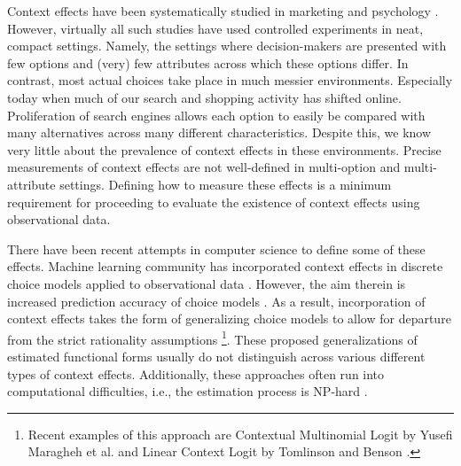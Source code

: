 \documentclass[a4paper,12pt]{article}
\newcommand{\citeyearonly}[1]{\citeyearpar{#1}}
\begin{document}
Context effects have been systematically studied in marketing and psychology \citep{kivetz04, roodrkerkEtAl11, frederickEtAl14, dotsonEtAl18}. However, virtually all such studies have used controlled experiments in neat, compact settings. Namely, the settings where decision-makers are presented with few options and (very) few attributes across which these options differ. In contrast, most actual choices take place in much messier environments. Especially today when much of our search and shopping activity has shifted online. Proliferation of search engines allows each option to easily be compared with many alternatives across many different characteristics. Despite this, we know very little about the prevalence of context effects in these environments. Precise measurements of context effects are not well-defined in multi-option and multi-attribute settings. Defining how to measure these effects is a minimum requirement for proceeding to evaluate the existence of context effects using observational data.

There have been recent attempts in computer science to define some of these effects. Machine learning community has incorporated context effects in discrete choice models applied to observational data \citep{pfannschmidt2019learning, bowerBalzano20}. However, the aim therein is increased prediction accuracy of choice models \citep{tomlinsonBenson21}. As a result, incorporation of context effects takes the form of generalizing choice models to allow for departure from the strict rationality assumptions \footnote{Recent examples of this approach are  Contextual Multinomial Logit by Yusefi Maragheh et al. \citeyearonly{yousefi2020choice} and Linear Context Logit by Tomlinson and Benson \citeyearonly{tomlinsonBenson21} .}. These proposed generalizations of estimated functional forms usually do not distinguish across various different types of context effects. Additionally, these approaches often run into computational difficulties, i.e., the estimation process is NP-hard \citep{yousefi2020choice}.
\end{document}
